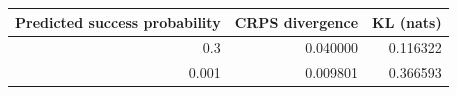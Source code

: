 \begin{tabular}{@{}rrr@{}}
\toprule
Predicted success probability & CRPS divergence & KL (nats)\\
\midrule
0.3 & 0.040000 & 0.116322 \\
0.001 & 0.009801 & 0.366593 \\
\bottomrule
\end{tabular}
